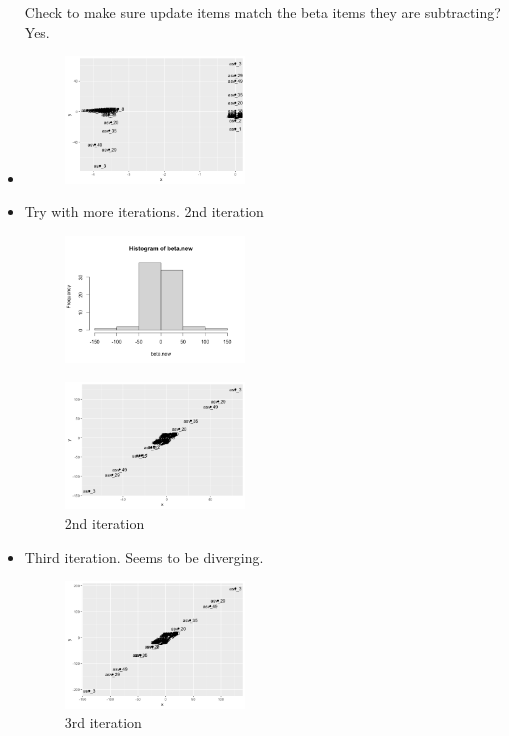 \documentclass[10pt]{article}
\theoremstyle{definition}
\begin{document}
\begin{itemize}
Check to make sure update items match the beta items they are subtracting? Yes.
\item \begin{figure}[!htb]
	\centering
	\includegraphics[width=0.45\textwidth]{img/Spring_2022_Journal-4c2e52e0.png}
	\caption{}
	\label{}
\end{figure}

\item Try with more iterations.
2nd iteration
\begin{figure}[!htb]
	\centering
	\includegraphics[width=0.45\textwidth]{img/Spring_2022_Journal-db626725.png}
	\caption{}
	\label{}
\end{figure}

\begin{figure}[!htb]
	\centering
	\includegraphics[width=0.45\textwidth]{img/Spring_2022_Journal-3fb47ab7.png}
	\caption{2nd iteration}
	\label{}
\end{figure}

\item Third iteration. Seems to be diverging.

\begin{figure}[!htb]
	\centering
	\includegraphics[width=0.45\textwidth]{img/Spring_2022_Journal-b7c8b87f.png}
	\caption{3rd iteration}
	\label{}
\end{figure}


\end{itemize}
\end{document}
